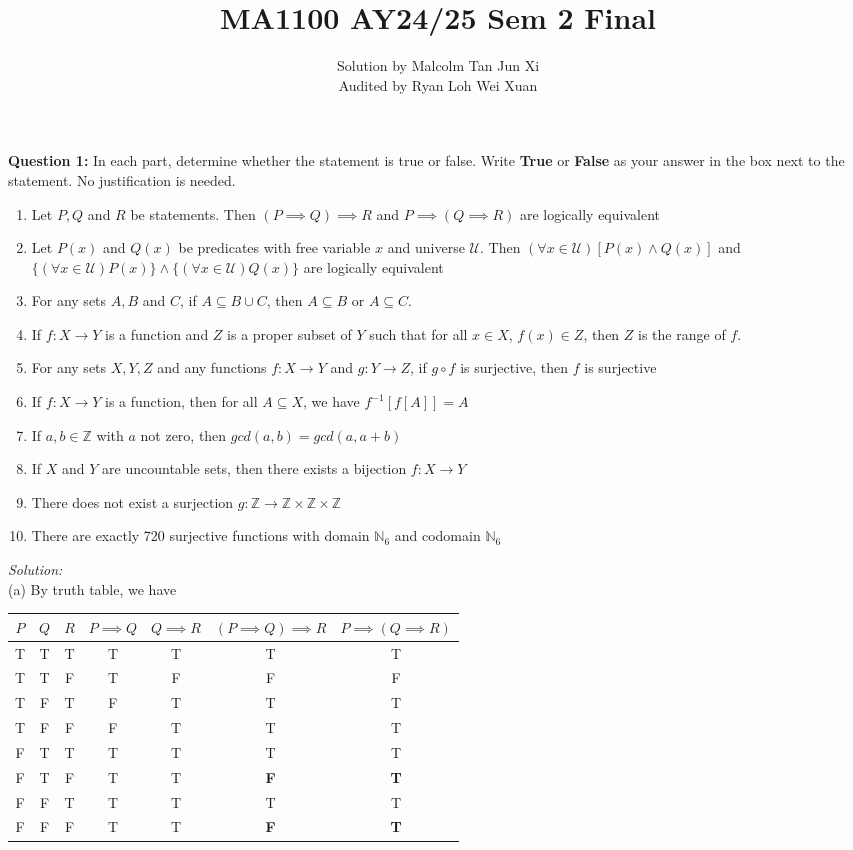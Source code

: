 \documentclass[12pt]{article}
\title{MA1100 AY24/25 Sem 2 Final}
\author{
  Solution by Malcolm Tan Jun Xi\\
  Audited by Ryan Loh Wei Xuan
}
\date{}
\newcommand{\U}{\mathcal{U}}
\newcommand{\Z}{\mathbb{Z}}
\newcommand{\N}{\mathbb{N}}
\begin{document}
\maketitle
\noindent\textbf{Question 1:} In each part, determine whether the statement is true or false. Write \textbf{True} or \textbf{False} as your answer in the box next to the statement. No justification is needed.
\begin{enumerate}[label=\alph*)]
    \item Let $P,Q$ and $R$ be statements. Then $(P\implies Q)\implies R$ and $P\implies(Q\implies R)$ are logically equivalent
    \item Let $P(x)$ and $Q(x)$ be predicates with free variable $x$ and universe $\mathcal{U}$. Then $(\forall x\in\mathcal{U})[P(x)\land Q(x)]$ and $\{(\forall x\in\mathcal{U})P(x)\}\land\{(\forall x\in\U) Q(x)\}$ are logically equivalent
    \item For any sets $A,B$ and $C$, if $A\subseteq B\cup C$, then $A\subseteq B$ or $A\subseteq C$.
    \item If $f:X\to Y$ is a function and $Z$ is a proper subset of $Y$ such that for all $x\in X$, $f(x)\in Z$, then $ Z$ is the range of $f$.
    \item For any sets $X,Y,Z$ and any functions $f:X\to Y$ and $g:Y\to Z$, if $g\circ f$ is surjective, then $f$ is surjective
    \item If $f:X\to Y$ is a function, then for all $A\subseteq X$, we have $f^{-1}[f[A]]=A$
    \item If $a,b\in\Z$ with $a$ not zero, then $gcd(a,b)=gcd(a,a+b)$
    \item If $X$ and $Y$ are uncountable sets, then there exists a bijection $f:X\to Y$
    \item There does not exist a surjection $g:\Z\to\Z\times\Z\times\Z$
    \item There are exactly 720 surjective functions with domain $\N_6$ and codomain $\N_6$
\end{enumerate}
\newpage
\noindent\emph{Solution:}\\
    (a) By truth table, we have
    \begin{table}[h!]
        \centering
        \begin{tabular}{|c|c|c|c|c|c|c|}\hline
            $P$ & $Q$ & $R$ & $P\implies Q$ & $Q\implies R$ & $(P\implies Q)\implies R$ & $P\implies(Q\implies R)$\\\hline
            T &  T&  T&  T&  T&  T& T\\\hline
            T &  T&  F&  T&  F&  F& F\\\hline
            T &  F&  T&  F&  T&  T& T\\\hline
            T &  F&  F&  F&  T&  T& T\\\hline
            F &  T&  T&  T&  T&  T& T\\\hline
             F&  T&  F&  T&  T&  \textbf{F}& \textbf{T}\\\hline
             F&  F&  T&  T&  T&  T& T\\ \hline
 F& F& F& T& T& \textbf{F}&\textbf{T}\\\hline
        \end{tabular}
    \end{table}\\
\end{document}
